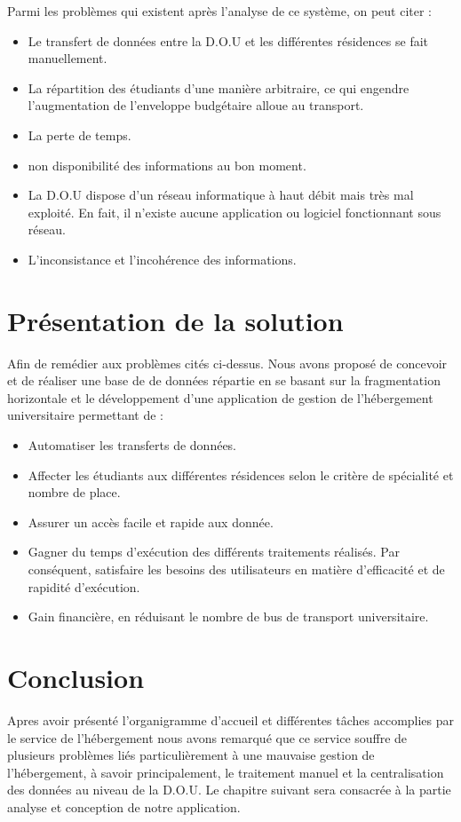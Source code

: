     Parmi les problèmes qui existent après l’analyse de ce système, on peut citer :
    \begin{itemize}
        \item Le transfert de données entre la \acs{D.O.U} et les différentes résidences se fait manuellement.
        \item La répartition des étudiants d’une manière arbitraire, ce qui engendre l’augmentation de l’enveloppe budgétaire alloue au transport. 
        \item La perte de temps.
        \item non disponibilité des informations au bon moment.
        \item La \acs{D.O.U} dispose d'un réseau informatique à haut débit mais très mal exploité. En fait, il n'existe aucune application ou logiciel fonctionnant sous réseau.
        \item L'inconsistance et l'incohérence des informations.\\
    \end{itemize}

\section{Présentation de la solution}
    Afin de remédier aux problèmes cités ci-dessus. Nous avons proposé de concevoir et de réaliser une base de de données répartie en se basant sur la fragmentation horizontale et le développement d'une application de gestion de l'hébergement universitaire permettant de :
    \begin{itemize}
        \item Automatiser les transferts de données.
        \item Affecter les étudiants aux différentes résidences selon le critère de spécialité et nombre de place. 
        \item Assurer un accès facile et rapide aux donnée.
        \item Gagner du temps d'exécution des différents traitements réalisés. Par conséquent, 
        satisfaire les besoins des utilisateurs en matière d'efficacité et de rapidité d'exécution.
        \item Gain financière, en réduisant le nombre de bus de transport universitaire. \\
    \end{itemize}

\section{Conclusion}
    Apres avoir présenté l’organigramme d’accueil et différentes tâches accomplies par le service de l'hébergement nous avons remarqué que ce service souffre de plusieurs problèmes liés particulièrement à une mauvaise gestion de l'hébergement, à savoir principalement, le traitement manuel et la centralisation des données au niveau de la \acs{D.O.U}. Le chapitre suivant sera consacrée à la partie analyse et conception de notre application.\\

\newpage

\leftskip=0cm
\renewcommand{\bibname}{Référence bibliographique et webographique du chapitre 1}
	
